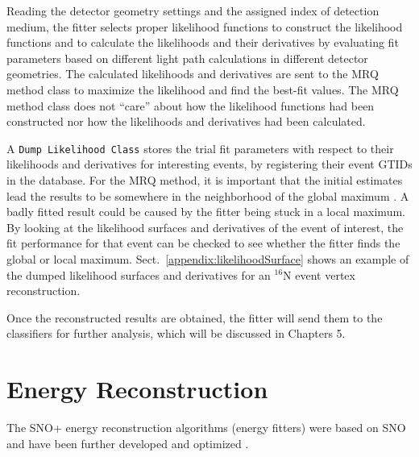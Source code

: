 Reading the detector geometry settings and the assigned index of detection medium, the fitter selects proper likelihood functions to construct the likelihood functions and to calculate the likelihoods and their derivatives by evaluating fit parameters based on different light path calculations in different detector geometries. The calculated likelihoods and derivatives are sent to the MRQ method class to maximize the likelihood and find the best-fit values. The MRQ method class does not ``care'' about how the likelihood functions had been constructed nor how the likelihoods and derivatives had been calculated. 
	
A \texttt{Dump Likelihood Class} stores the trial fit parameters with respect to their likelihoods and derivatives for interesting events, by registering their event GTIDs in the database. For the MRQ method, it is important that the initial estimates lead the results to be somewhere in the neighborhood of the global maximum \cite{gregory2005bayesian}. A badly fitted result could be caused by the fitter being stuck in a local maximum. By looking at the likelihood surfaces and derivatives of the event of interest, the fit performance for that event can be checked to see whether the fitter finds the global or local maximum. Sect.~\ref{appendix:likelihoodSurface} shows an example of the dumped likelihood surfaces and derivatives for an $^{16}$N event vertex reconstruction.

Once the reconstructed results are obtained, the fitter will send them to the classifiers for further analysis, which will be discussed in Chapters 5.

\section{Energy Reconstruction}\label{sect:energyFitter}

The SNO+ energy reconstruction algorithms (energy fitters) were based on SNO \cite{boulay2004direct,moffat2001optical} and have been further developed and optimized \cite{jones2011background,walker2016study,energyRSP}. 

